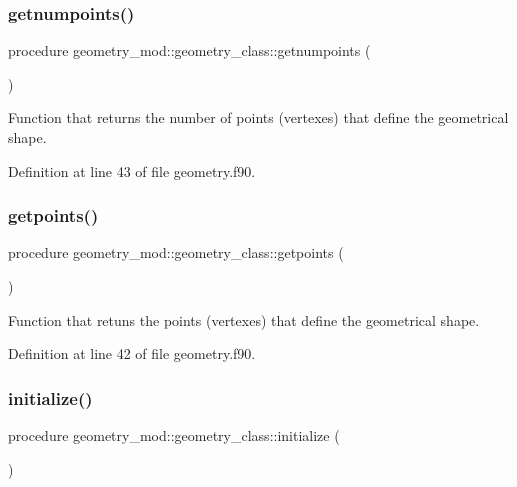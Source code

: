 \subsubsection{\texorpdfstring{getnumpoints()}{getnumpoints()}}
{\footnotesize\ttfamily procedure geometry\+\_\+mod\+::geometry\+\_\+class\+::getnumpoints (\begin{DoxyParamCaption}{ }\end{DoxyParamCaption})\hspace{0.3cm}{\ttfamily [private]}}



Function that returns the number of points (vertexes) that define the geometrical shape. 



Definition at line 43 of file geometry.\+f90.

\mbox{\label{structgeometry__mod_1_1geometry__class_a4dd64d46f41c5c429a0b2b88250fa04e}} 
\subsubsection{\texorpdfstring{getpoints()}{getpoints()}}
{\footnotesize\ttfamily procedure geometry\+\_\+mod\+::geometry\+\_\+class\+::getpoints (\begin{DoxyParamCaption}{ }\end{DoxyParamCaption})\hspace{0.3cm}{\ttfamily [private]}}



Function that retuns the points (vertexes) that define the geometrical shape. 



Definition at line 42 of file geometry.\+f90.

\mbox{\label{structgeometry__mod_1_1geometry__class_a97a9a90ff4143d41fe57eb0e6d1c76a1}} 
\subsubsection{\texorpdfstring{initialize()}{initialize()}}
{\footnotesize\ttfamily procedure geometry\+\_\+mod\+::geometry\+\_\+class\+::initialize (\begin{DoxyParamCaption}{ }\end{DoxyParamCaption})\hspace{0.3cm}{\ttfamily [private]}}



